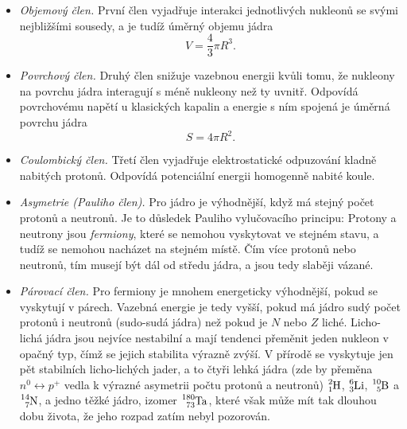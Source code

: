 \documentclass[a4paper,12pt,oneside]{article}
\theoremstyle{red}
\begin{document}
    \begin{itemize}
        \item\emph{Objemový člen.}
            První člen vyjadřuje interakci jednotlivých nukleonů se svými nejbližšími sousedy, a je tudíž úměrný objemu jádra
            \begin{equation}
                V=\frac{4}{3}\pi R^{3}.
            \end{equation}
    
        \item\emph{Povrchový člen.}
            Druhý člen snižuje vazebnou energii kvůli tomu, že nukleony na povrchu jádra interagují s méně nukleony než ty uvnitř.
            Odpovídá povrchovému napětí u klasických kapalin a energie s ním spojená je úměrná povrchu jádra
            \begin{equation}
                S=4\pi R^{2}.
            \end{equation}

        \item\emph{Coulombický člen.}
            Třetí člen vyjadřuje elektrostatické odpuzování kladně nabitých protonů.
            Odpovídá potenciální energii homogenně nabité koule.

        \item\emph{Asymetrie (Pauliho člen).}
            Pro jádro je výhodnější, když má stejný počet protonů a neutronů.
            Je to důsledek Pauliho vylučovacího principu: 
            Protony a neutrony jsou \emph{fermiony}, které se nemohou vyskytovat ve stejném stavu, a tudíž se nemohou nacházet na stejném místě.
            Čím více protonů nebo neutronů, tím musejí být dál od středu jádra, a jsou tedy slaběji vázané.

        \item\emph{Párovací člen.}
            Pro fermiony je mnohem energeticky výhodnější, pokud se vyskytují v párech.
            Vazebná energie je tedy vyšší, pokud má jádro sudý počet protonů i neutronů (sudo-sudá jádra) než pokud je $N$ nebo $Z$ liché.
            Licho-lichá jádra jsou nejvíce nestabilní a mají tendenci přeměnit jeden nukleon v opačný typ, čímž se jejich stabilita výrazně zvýší.
            V přírodě se vyskytuje jen pět stabilních licho-lichých jader, a to čtyři lehká jádra (zde by přeměna $n^{0}\leftrightarrow p^{+}$ vedla k výrazné asymetrii počtu protonů a neutronů)
                $\ce{^{2}_{1}H}$, 
                $\ce{^{6}_{3}Li}$, 
                $\ce{^{10}_{5}B}$ a
                $\ce{^{14}_{7}N}$,
            a jedno těžké jádro, izomer $\ce{^{180}_{73}Ta}$, které však může mít tak dlouhou dobu života, že jeho rozpad zatím nebyl pozorován.


\end{itemize}
\end{document}
